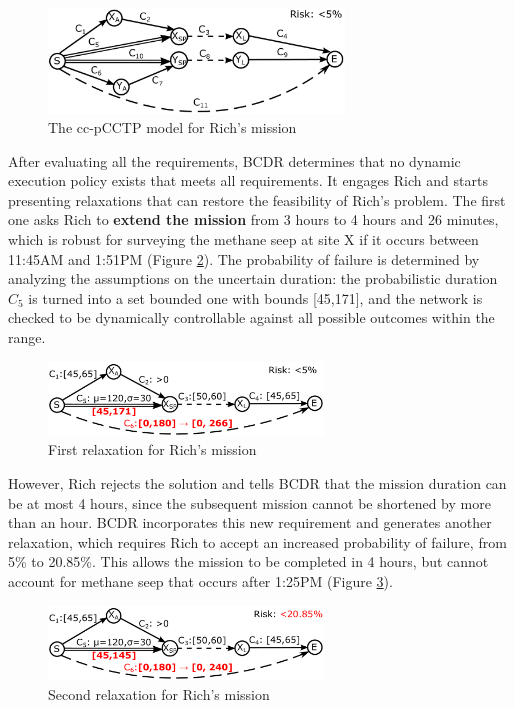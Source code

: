 \documentclass[jair,twoside,11pt,theapa]{article}
\begin{document}
\begin{figure}[htb]
	\centering
	\includegraphics[width=0.7\textwidth]{figures/ccpstp_example.pdf}
	\caption{The cc-pCCTP model for Rich's mission}
	\label{fig:sample_ccpctp}
\end{figure}

After evaluating all the requirements, BCDR determines that no dynamic
execution policy exists that meets all requirements. It engages Rich and starts
presenting relaxations that can restore the feasibility of Rich's problem. The
first one asks Rich to \textbf{extend the mission} from 3 hours to 4 hours and 26
minutes, which is robust for surveying the methane seep at site X if it occurs between 11:45AM
and 1:51PM (Figure \ref{fig:sample_ccpstp_sol1}). The probability of failure is determined by analyzing the assumptions on the uncertain duration: the probabilistic duration $C_5$ is turned into a set bounded one with bounds [45,171], and the network is checked to be dynamically controllable against all possible outcomes within the range.

\begin{figure}[htb]
	\centering
	\includegraphics[width=0.65\textwidth]{figures/ccpstp_example_s1.pdf}
	\caption{First relaxation for Rich's mission}
	\label{fig:sample_ccpstp_sol1}
\end{figure}

However, Rich rejects the solution and tells BCDR that the mission duration can
be at most 4 hours, since the subsequent mission cannot be shortened by more
than an hour. BCDR incorporates this new requirement and generates another
relaxation, which requires Rich to accept an increased probability of failure, from 5\% to 20.85\%. This allows
the mission to be completed in 4 hours, but cannot account for methane seep that
occurs after 1:25PM (Figure \ref{fig:sample_ccpstp_sol2}).

\begin{figure}[htb!]
	\centering
	\includegraphics[width=0.65\textwidth]{figures/ccpstp_example_s2.pdf}
	\caption{Second relaxation for Rich's mission}
	\label{fig:sample_ccpstp_sol2}
\end{figure}
\end{document}
